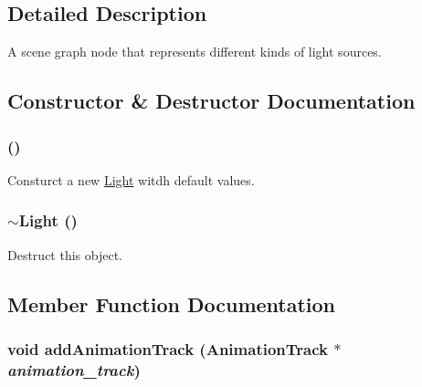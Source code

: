 \subsection{Detailed Description}
A scene graph node that represents different kinds of light sources. 

\subsection{Constructor \& Destructor Documentation}
\hypertarget{classm3g_1_1Light_7f8a7be05225f470c200f7e4ff914a3c}{
\subsubsection[{Light}]{ ()}}
\label{classm3g_1_1Light_7f8a7be05225f470c200f7e4ff914a3c}


Consturct a new \hyperlink{classm3g_1_1Light}{Light} witdh default values. \hypertarget{classm3g_1_1Light_f50d3d8cdb323e1a9fbd7bfac3aeba06}{
\subsubsection[{$\sim$Light}]{\setlength{\rightskip}{0pt plus 5cm}$\sim${\bf Light} ()}}
\label{classm3g_1_1Light_f50d3d8cdb323e1a9fbd7bfac3aeba06}


Destruct this object. 

\subsection{Member Function Documentation}
\hypertarget{classm3g_1_1Light_415c0b110f95410ded9b85e5d99a496b}{
\subsubsection[{addAnimationTrack}]{\setlength{\rightskip}{0pt plus 5cm}void addAnimationTrack ({\bf AnimationTrack} $\ast$ {\em animation\_\-track})}}
\label{classm3g_1_1Light_415c0b110f95410ded9b85e5d99a496b}


